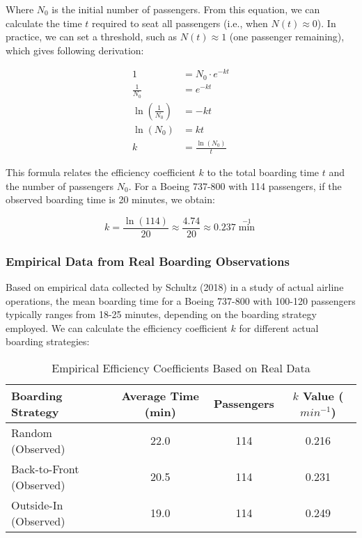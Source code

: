 \documentclass[12pt]{article}
\begin{document}
Where $N_0$ is the initial number of passengers. From this equation, we can calculate the time $t$ required to seat all passengers (i.e., when $N(t) \approx 0$). In practice, we can set a threshold, such as $N(t) \approx 1$ (one passenger remaining), which gives following derivation:

\begin{align}
1 &= N_0 \cdot e^{-kt} \\
\frac{1}{N_0} &= e^{-kt} \\
\ln\left(\frac{1}{N_0}\right) &= -kt \\
\ln(N_0) &= kt \\
k &= \frac{\ln(N_0)}{t}
\end{align}

This formula relates the efficiency coefficient $k$ to the total boarding time $t$ and the number of passengers $N_0$. For a Boeing 737-800 with 114 passengers, if the observed boarding time is 20 minutes, we obtain:

\begin{equation}
k = \frac{\ln(114)}{20} \approx \frac{4.74}{20} \approx 0.237 \min^{-1}
\end{equation}

\subsubsection{Empirical Data from Real Boarding Observations}

Based on empirical data collected by Schultz (2018) in a study of actual airline operations, the mean boarding time for a Boeing 737-800 with 100-120 passengers typically ranges from 18-25 minutes, depending on the boarding strategy employed. We can calculate the efficiency coefficient $k$ for different actual boarding strategies:

\begin{table}[H]
\centering
\caption{Empirical Efficiency Coefficients Based on Real Data}
\begin{tabular}{lccc}
\toprule
\textbf{Boarding Strategy} & \textbf{Average Time (min)} & \textbf{Passengers} & \textbf{$k$ Value ($min^{-1}$)} \\
\midrule
Random (Observed) & 22.0 & 114 & 0.216 \\
Back-to-Front (Observed) & 20.5 & 114 & 0.231 \\
Outside-In (Observed) & 19.0 & 114 & 0.249 \\
\bottomrule
\end{tabular}
\end{table}
\end{document}
